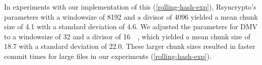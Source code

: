 In experiments with our implementation of this 
(\autoref{rolling-hash-exp}), Rsyncrypto's parameters with a \gls{windowsize} of
\SI{8192}{\byte} and a divisor of \num{4096} yielded a mean chunk size of
\SI{4.1}{\kib} with a standard deviation of \SI{4.6}{\kib}. We adjusted the
parameters for DMV to a \gls{windowsize} of \SI{32}{\kib} and a divisor of
\SI{16}{\kibi\relax}, which yielded a mean chunk size of \SI{18.7}{\kib} with a
standard deviation of \SI{22.0}{\kib}. These larger chunk sizes resulted in
faster commit times for large files in our experiments
(\autoref{rolling-hash-exp}).

